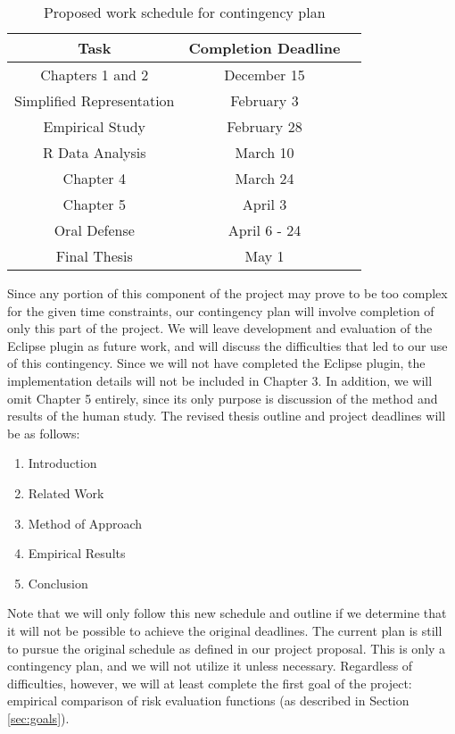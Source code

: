 \begin{table}[b]
\centering
\begin{tabular}{|c||c|c|}
\hline
\bf Task & \bf Completion Deadline\\\hline\hline
Chapters 1 and 2 & December 15\\\hline
Simplified Representation& February 3\\\hline
Empirical Study & February 28\\\hline
R Data Analysis & March 10\\\hline
Chapter 4 & March 24\\\hline
Chapter 5 & April 3\\\hline
Oral Defense & April 6 - 24\\\hline
Final Thesis & May 1\\\hline
\end{tabular}
\caption{Proposed work schedule for contingency plan}
\label{tab:research}
\end{table}

Since any portion of this component of the project may prove to be too
complex for the given time constraints, our contingency plan will involve completion
of only this part of the project.  We will leave development and evaluation of the
Eclipse plugin as future work, and will discuss the difficulties that led to our use
of this contingency.  Since we will not have completed the Eclipse plugin, the
implementation details will not be included in Chapter 3.  In addition, we will
omit Chapter 5 entirely, since its only purpose is discussion of the method and
results of the human study.  The revised thesis outline and project deadlines will
be as follows:

\begin{enumerate}
\item Introduction
\item Related Work
\item Method of Approach
\item Empirical Results
\item Conclusion
\end{enumerate}

Note that we will only follow this new schedule and outline if we determine that
it will not be possible to achieve the original deadlines.  The current plan is
still to pursue the original schedule as defined in our project proposal.  This
is only a contingency plan, and we will not utilize it unless necessary.  Regardless
of difficulties, however, we will at least complete the first goal of the project:
empirical comparison of risk evaluation functions (as described in Section \ref{sec:goals}).